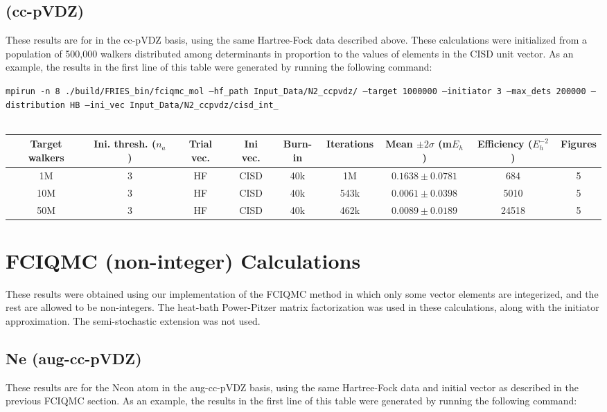 \documentclass[12pt, landscape]{article}
\begin{document}
\subsection*{ (cc-pVDZ)}
These results are for  in the cc-pVDZ basis, using the same Hartree-Fock data described above. These calculations were initialized from a population of 500,000 walkers distributed among determinants in proportion to the values of elements in the CISD unit vector. As an example, the results in the first line of this table were generated by running the following command:

\texttt{mpirun -n 8 ./build/FRIES\_bin/fciqmc\_mol --hf\_path Input\_Data/N2\_ccpvdz/ --target 1000000 --initiator 3 --max\_dets 200000 --distribution HB --ini\_vec Input\_Data/N2\_ccpvdz/cisd\_int\_}
\\~\\
\begin{tabular}{c|c|c|c|c|c|c|c|c}
Target walkers & Ini. thresh. ($n_a$) & Trial vec. & Ini vec. & Burn-in & Iterations & Mean $\pm 2 \sigma$ (m$E_h$) & Efficiency ($E_h^{-2}$) & Figures \\ \hline
1M & 3 & HF & CISD & 40k & 1M & $0.1638 \pm 0.0781$ & 684 & 5\\
10M & 3 & HF & CISD & 40k & 543k & $0.0061 \pm 0.0398$ & 5010 & 5\\
50M & 3 & HF & CISD & 40k & 462k & $0.0089 \pm 0.0189$ & 24518 & 5 \\
\end{tabular}


\section*{FCIQMC (non-integer) Calculations}
These results were obtained using our implementation of the FCIQMC method in which only some vector elements are integerized, and the rest are allowed to be non-integers. The heat-bath Power-Pitzer matrix factorization was used in these calculations, along with the initiator approximation. The semi-stochastic extension was not used.

\subsection*{Ne (aug-cc-pVDZ)}
These results are for the Neon atom in the aug-cc-pVDZ basis, using the same Hartree-Fock data and initial vector as described in the previous FCIQMC section. As an example, the results in the first line of this table were generated by running the following command:
\end{document}
